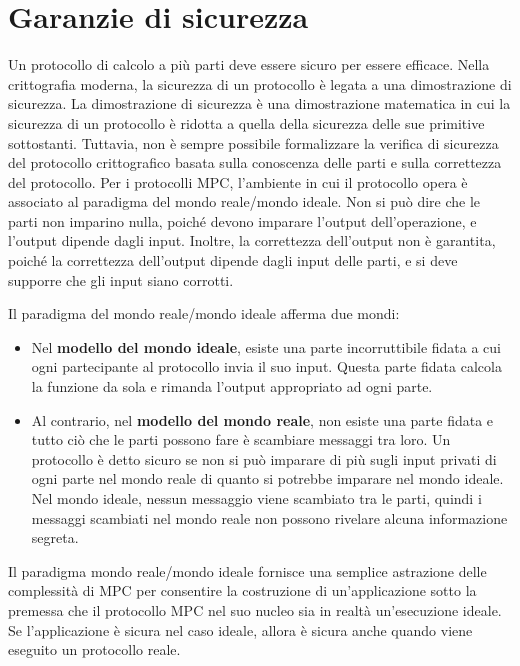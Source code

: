 \documentclass[
  italian,
]{book}
\providecommand{\tightlist}{%
  \setlength{\itemsep}{0pt}\setlength{\parskip}{0pt}}
\begin{document}
\hypertarget{garanzie-di-sicurezza}{%
\section{Garanzie di sicurezza}\label{garanzie-di-sicurezza}}

Un protocollo di calcolo a più parti deve essere sicuro per essere efficace. Nella crittografia moderna, la sicurezza di un protocollo è legata a una dimostrazione di sicurezza. La dimostrazione di sicurezza è una dimostrazione matematica in cui la sicurezza di un protocollo è ridotta a quella della sicurezza delle sue primitive sottostanti. Tuttavia, non è sempre possibile formalizzare la verifica di sicurezza del protocollo crittografico basata sulla conoscenza delle parti e sulla correttezza del protocollo. Per i protocolli MPC, l'ambiente in cui il protocollo opera è associato al paradigma del mondo reale/mondo ideale. Non si può dire che le parti non imparino nulla, poiché devono imparare l'output dell'operazione, e l'output dipende dagli input. Inoltre, la correttezza dell'output non è garantita, poiché la correttezza dell'output dipende dagli input delle parti, e si deve supporre che gli input siano corrotti.

Il paradigma del mondo reale/mondo ideale afferma due mondi:

\begin{itemize}
\tightlist
\item
  Nel \textbf{modello del mondo ideale}, esiste una parte incorruttibile fidata a cui ogni partecipante al protocollo invia il suo input. Questa parte fidata calcola la funzione da sola e rimanda l'output appropriato ad ogni parte.
\item
  Al contrario, nel \textbf{modello del mondo reale}, non esiste una parte fidata e tutto ciò che le parti possono fare è scambiare messaggi tra loro. Un protocollo è detto sicuro se non si può imparare di più sugli input privati di ogni parte nel mondo reale di quanto si potrebbe imparare nel mondo ideale. Nel mondo ideale, nessun messaggio viene scambiato tra le parti, quindi i messaggi scambiati nel mondo reale non possono rivelare alcuna informazione segreta.
\end{itemize}

\newpage

Il paradigma mondo reale/mondo ideale fornisce una semplice astrazione delle complessità di MPC per consentire la costruzione di un'applicazione sotto la premessa che il protocollo MPC nel suo nucleo sia in realtà un'esecuzione ideale. Se l'applicazione è sicura nel caso ideale, allora è sicura anche quando viene eseguito un protocollo reale.
\end{document}
